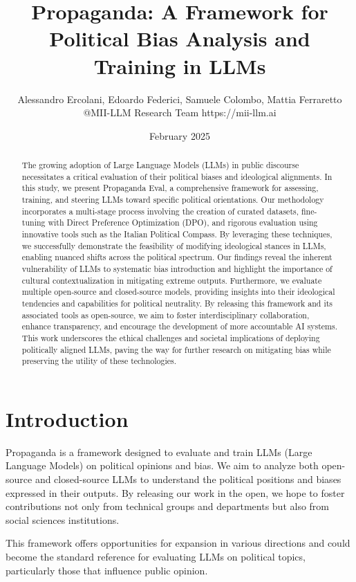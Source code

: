 \documentclass{article}
\title{Propaganda: A Framework for Political Bias Analysis and Training in LLMs}
\author{Alessandro Ercolani, Edoardo Federici, Samuele Colombo, Mattia Ferraretto \\ @MII-LLM Research Team https://mii-llm.ai}
\date{February 2025}
\begin{document}
\maketitle

\begin{abstract}
The growing adoption of Large Language Models (LLMs) in public discourse necessitates a critical evaluation of their political biases and ideological alignments. In this study, we present Propaganda Eval, a comprehensive framework for assessing, training, and steering LLMs toward specific political orientations. Our methodology incorporates a multi-stage process involving the creation of curated datasets, fine-tuning with Direct Preference Optimization (DPO), and rigorous evaluation using innovative tools such as the Italian Political Compass. By leveraging these techniques, we successfully demonstrate the feasibility of modifying ideological stances in LLMs, enabling nuanced shifts across the political spectrum. Our findings reveal the inherent vulnerability of LLMs to systematic bias introduction and highlight the importance of cultural contextualization in mitigating extreme outputs. Furthermore, we evaluate multiple open-source and closed-source models, providing insights into their ideological tendencies and capabilities for political neutrality. By releasing this framework and its associated tools as open-source, we aim to foster interdisciplinary collaboration, enhance transparency, and encourage the development of more accountable AI systems. This work underscores the ethical challenges and societal implications of deploying politically aligned LLMs, paving the way for further research on mitigating bias while preserving the utility of these technologies.
\end{abstract}
\newpage
\section{Introduction}
Propaganda is a framework designed to evaluate and train LLMs (Large Language Models) on political opinions and bias. We aim to analyze both open-source and closed-source LLMs to understand the political positions and biases expressed in their outputs. By releasing our work in the open, we hope to foster contributions not only from technical groups and departments but also from social sciences institutions.

This framework offers opportunities for expansion in various directions and could become the standard reference for evaluating LLMs on political topics, particularly those that influence public opinion.
\end{document}
